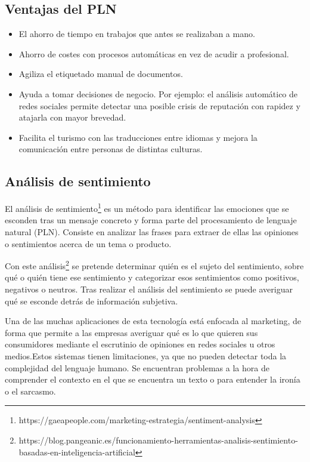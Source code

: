 \subsection{Ventajas del PLN}

\begin{itemize}
	\item El ahorro de tiempo en trabajos que antes se realizaban a mano.
	\item Ahorro de costes con procesos automáticas en vez de acudir a profesional.
	\item Agiliza el etiquetado manual de documentos.
	\item Ayuda a tomar decisiones de negocio. Por ejemplo: el análisis automático de redes sociales permite detectar una posible crisis de reputación con rapidez y atajarla con mayor brevedad.
	\item Facilita el turismo con las traducciones entre idiomas y mejora la comunicación entre personas de distintas culturas.
\end{itemize}

\subsection{Análisis de sentimiento} \label{sentiment}

El análisis de sentimiento\footnote{https://gaeapeople.com/marketing-estrategia/sentiment-analysis} es un método para identificar las emociones que se esconden tras un mensaje concreto y forma parte del procesamiento de lenguaje natural (PLN). Consiste en analizar las frases para extraer de ellas las opiniones o sentimientos acerca de un tema o producto.

Con este análisis\footnote{https://blog.pangeanic.es/funcionamiento-herramientas-analisis-sentimiento-basadas-en-inteligencia-artificial} se pretende determinar quién es el sujeto del sentimiento, sobre qué o quién tiene ese sentimiento y categorizar esos sentimientos como positivos, negativos o neutros. Tras realizar el análisis del sentimiento se puede averiguar qué se esconde detrás de información subjetiva.

Una de las muchas aplicaciones de esta tecnología está enfocada al marketing, de forma que permite a las empresas averiguar qué es lo que quieren sus consumidores mediante el escrutinio de opiniones en redes sociales u otros medios.Estos sistemas tienen limitaciones, ya que no pueden detectar toda la complejidad del lenguaje humano. Se encuentran problemas a la hora de comprender el contexto en el que se encuentra un texto o para entender la ironía o el sarcasmo.

